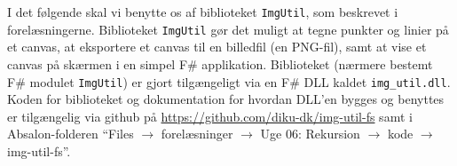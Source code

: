 I det følgende skal vi benytte os af biblioteket \texttt{ImgUtil}, som
beskrevet i forelæsningerne. Biblioteket \texttt{ImgUtil} gør det
muligt at tegne punkter og linier på et canvas, at eksportere et
canvas til en billedfil (en PNG-fil), samt at vise et canvas på
skærmen i en simpel F\# applikation. Biblioteket (nærmere bestemt F\#
modulet \texttt{ImgUtil}) er gjort tilgængeligt via en F\# DLL kaldet
\texttt{img\_util.dll}. Koden for biblioteket og dokumentation for
hvordan DLL'en bygges og benyttes er tilgængelig via github på
\url{https://github.com/diku-dk/img-util-fs} samt i Absalon-folderen
``Files $\rightarrow$ forelæsninger $\rightarrow$ Uge 06: Rekursion $\rightarrow$ kode $\rightarrow$
img-util-fs''.
